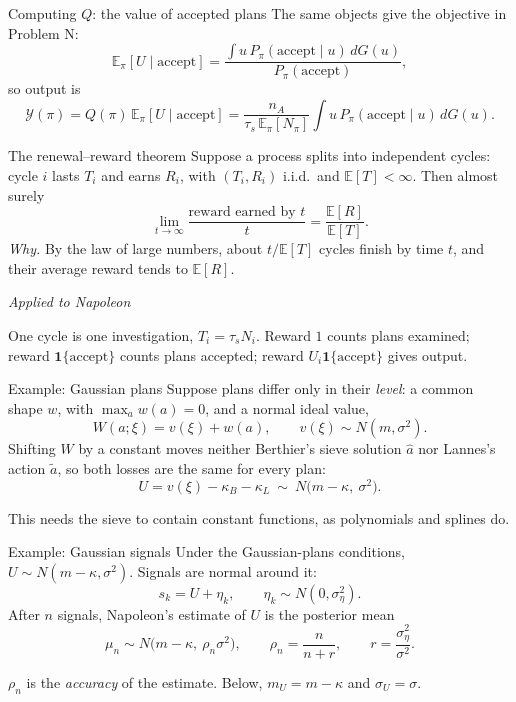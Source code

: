 \documentclass[aspectratio=169,11pt,t]{beamer}
\newcommand{\head}[2][ink]{{\itshape\color{#1}#2}\par\vspace{0.15cm}}
\newcommand{\aside}[1]{{\small\color{muted}#1\par}}
\newcommand{\E}{\mathbb{E}}
\newcommand{\Ycal}{\mathcal{Y}}
\begin{document}
\begin{frame}{Computing $Q$: the value of accepted plans}
  The same objects give the objective in Problem N:
  \[\E_\pi[U\mid\text{accept}]=\frac{\int u\,P_\pi(\text{accept}\mid u)\,dG(u)}{P_\pi(\text{accept})},\]
  so output is
  \[\Ycal(\pi)=Q(\pi)\,\E_\pi[U\mid\text{accept}]=\frac{n_A}{\tau_s\,\E_\pi[N_\pi]}\int u\,P_\pi(\text{accept}\mid u)\,dG(u).\]
\end{frame}

\begin{frame}{The renewal--reward theorem}
  Suppose a process splits into independent cycles: cycle $i$ lasts $T_i$ and earns $R_i$, with $(T_i,R_i)$ i.i.d.\ and $\E[T]<\infty$. Then almost surely
  \[\lim_{t\to\infty}\frac{\text{reward earned by }t}{t}=\frac{\E[R]}{\E[T]}.\]
  \emph{Why.} By the law of large numbers, about $t/\E[T]$ cycles finish by time $t$, and their average reward tends to $\E[R]$.
  \vspace{0.2cm}

  \head{Applied to Napoleon}
  One cycle is one investigation, $T_i=\tau_sN_i$. Reward $1$ counts plans examined; reward $\mathbf{1}\{\text{accept}\}$ counts plans accepted; reward $U_i\mathbf{1}\{\text{accept}\}$ gives output.
\end{frame}

\begin{frame}{Example: Gaussian plans}
  Suppose plans differ only in their \emph{level}: a common shape $w$, with $\max_aw(a)=0$, and a normal ideal value,
  \[W(a;\xi)=v(\xi)+w(a),\qquad v(\xi)\sim N(m,\sigma^2).\]
  Shifting $W$ by a constant moves neither Berthier's sieve solution $\hat a$ nor Lannes's action $\tilde a$, so both losses are the same for every plan:
  \[U=v(\xi)-\kappa_B-\kappa_L\ \sim\ N\big(m-\kappa,\ \sigma^2\big).\]
  \aside{This needs the sieve to contain constant functions, as polynomials and splines do.}
\end{frame}

\begin{frame}{Example: Gaussian signals}
  Under the Gaussian-plans conditions, $U\sim N(m-\kappa,\sigma^2)$. Signals are normal around it:
  \[s_k=U+\eta_k,\qquad\eta_k\sim N(0,\sigma_\eta^2).\]
  After $n$ signals, Napoleon's estimate of $U$ is the posterior mean
  \[\mu_n\sim N\big(m-\kappa,\ \rho_n\sigma^2\big),\qquad\rho_n=\frac{n}{n+r},\qquad r=\frac{\sigma_\eta^2}{\sigma^2}.\]
  \aside{$\rho_n$ is the \emph{accuracy} of the estimate. Below, $m_U=m-\kappa$ and $\sigma_U=\sigma$.}
\end{frame}
\end{document}
